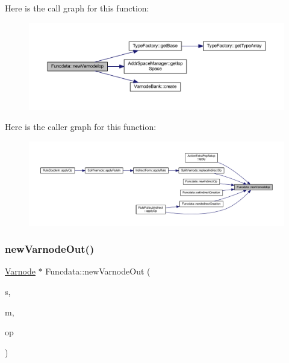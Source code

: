 Here is the call graph for this function\+:
\nopagebreak
\begin{figure}[H]
\begin{center}
\leavevmode
\includegraphics[width=350pt]{class_funcdata_a8ee39fe2d1f2f4702864e78dc06e6bb8_cgraph}
\end{center}
\end{figure}
Here is the caller graph for this function\+:
\nopagebreak
\begin{figure}[H]
\begin{center}
\leavevmode
\includegraphics[width=350pt]{class_funcdata_a8ee39fe2d1f2f4702864e78dc06e6bb8_icgraph}
\end{center}
\end{figure}
\mbox{\label{class_funcdata_a100e6704e4c245e076170268d31b47ec}} 
\subsubsection{\texorpdfstring{newVarnodeOut()}{newVarnodeOut()}}
{\footnotesize\ttfamily \mbox{\hyperlink{class_varnode}{Varnode}} $\ast$ Funcdata\+::new\+Varnode\+Out (\begin{DoxyParamCaption}\item[{int4}]{s,  }\item[{const \mbox{\hyperlink{class_address}{Address}} \&}]{m,  }\item[{\mbox{\hyperlink{class_pcode_op}{Pcode\+Op}} $\ast$}]{op }\end{DoxyParamCaption})}



